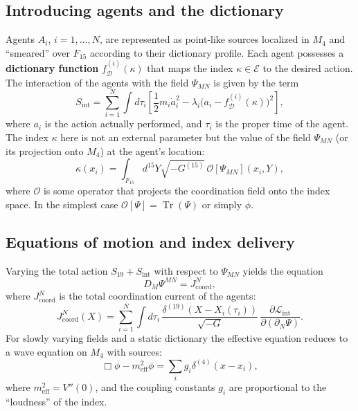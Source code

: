 \documentclass[12pt,a4paper]{article}
\DeclareMathOperator{\Tr}{Tr}
\begin{document}
	\subsection{Introducing agents and the dictionary}
	
	Agents \(A_i\), \(i=1,\dots,N\), are represented as point‑like sources localized in \(M_4\) and “smeared” over \(F_{15}\) according to their dictionary profile. Each agent possesses a \textbf{dictionary function} \(f_{\mathcal{D}}^{(i)}(\kappa)\) that maps the index \(\kappa \in \mathcal{E}\) to the desired action. The interaction of the agents with the field \(\Psi_{MN}\) is given by the term
	\begin{equation}
		S_{\mathrm{int}} = \sum_{i=1}^{N} \int d\tau_i \left[ \frac{1}{2} m_i \dot a_i^2 - \lambda_i \bigl( a_i - f_{\mathcal{D}}^{(i)}(\kappa) \bigr)^2 \right],
		\label{eq:Sint}
	\end{equation}
	where \(a_i\) is the action actually performed, and \(\tau_i\) is the proper time of the agent. The index \(\kappa\) here is not an external parameter but the value of the field \(\Psi_{MN}\) (or its projection onto \(M_4\)) at the agent’s location:
	\begin{equation}
		\kappa(x_i) = \int_{F_{15}} d^{15}Y \sqrt{-G^{(15)}}\, \mathcal{O}[\Psi_{MN}](x_i, Y),
		\label{eq:kappa}
	\end{equation}
	where \(\mathcal{O}\) is some operator that projects the coordination field onto the index space. In the simplest case \(\mathcal{O}[\Psi] = \Tr(\Psi)\) or simply \(\phi\).
	
	\subsection{Equations of motion and index delivery}
	
	Varying the total action \(S_{19} + S_{\mathrm{int}}\) with respect to \(\Psi_{MN}\) yields the equation
	\begin{equation}
		D_M \Psi^{MN} = J^{N}_{\mathrm{coord}},
		\label{eq:Psi-eq}
	\end{equation}
	where \(J^{N}_{\mathrm{coord}}\) is the total coordination current of the agents:
	\begin{equation}
		J^{N}_{\mathrm{coord}}(X) = \sum_{i=1}^{N} \int d\tau_i\, \frac{\delta^{(19)}(X - X_i(\tau_i))}{\sqrt{-G}}\, \frac{\partial \mathcal{L}_{\mathrm{int}}}{\partial (\partial_N \Psi)}.
	\end{equation}
	For slowly varying fields and a static dictionary the effective equation reduces to a wave equation on \(M_4\) with sources:
	\begin{equation}
		\Box \phi - m_{\mathrm{eff}}^2 \phi = \sum_{i} g_i \delta^{(4)}(x - x_i),
		\label{eq:phi-eq}
	\end{equation}
	where \(m_{\mathrm{eff}}^2 = V''(0)\), and the coupling constants \(g_i\) are proportional to the “loudness” of the index.
	
\end{document}
